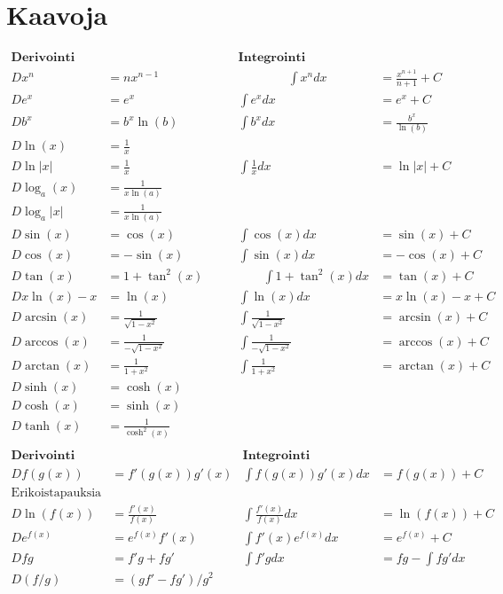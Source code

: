 \documentclass[12pt]{article}
\begin{document}
\section*{Kaavoja}

$$
\begin{array}{rl|rl}
\textbf{Derivointi} && \textbf{Integrointi}&\\[2mm]
Dx^n&=nx^{n-1}     \qquad\qquad&\qquad\qquad\int x^ndx&=\frac{x^{n+1}}{n+1}+C \\[2mm]
De^x&=e^x &\int e^xdx&=e^x+C\\[2mm]
Db^x&=b^x\ln(b) & \int b^xdx&=\frac{b^x}{\ln(b)}\\[2mm]
D\ln(x)&=\frac{1}{x} &&\\[2mm]
D\ln|x|&=\frac{1}{x} &\int\frac{1}{x}dx&=\ln|x|+C\\[2mm]
D\log_a(x)&=\frac{1}{x\ln(a)} &&\\[2mm]
D\log_a|x|&=\frac{1}{x\ln(a)} &&\\[2mm]
D\sin(x)&=\cos(x)   &\int\cos(x)dx&=\sin(x)+C\\[2mm]
D\cos(x)&=-\sin(x)  &\int\sin(x)dx&=-\cos(x)+C\\[2mm]
D\tan(x)&=1+\tan^2(x) \qquad&\qquad\int 1+\tan^2(x)dx&=\tan(x)+C\\[2mm]

Dx\ln(x)-x&=\ln(x) & \int\ln(x)dx&=x\ln(x)-x+C\\[10mm]

D\arcsin(x)&=\frac{1}{\sqrt{1-x^2}} & \int\frac{1}{\sqrt{1-x^2}}&=\arcsin(x)+C\\
D\arccos(x)&=\frac{1}{-\sqrt{1-x^2}} & \int\frac{1}{-\sqrt{1-x^2}}&=\arccos(x)+C\\
D\arctan(x)&=\frac{1}{1+x^2} & \int\frac{1}{1+x^2}&=\arctan(x)+C\\

D\sinh(x)&=\cosh(x) &&\\
D\cosh(x)&=\sinh(x) &&\\
D\tanh(x)&=\frac{1}{\cosh^2(x)} &&\\
\end{array}  
$$
\vspace{1cm}
$$
\begin{array}{rl|rl}
\textbf{Derivointi} && \textbf{Integrointi}&\\[2mm]
D f(g(x))&=f'(g(x))g'(x) & \int f(g(x))g'(x)dx&=f(g(x))+C\\[2mm]
\textrm{Erikoistapauksia} &&&\\
D\ln(f(x))&=\frac{f'(x)}{f(x)} & \int \frac{f'(x)}{f(x)}dx&=\ln(f(x))+C\\[2mm]
D e^{f(x)}&=e^{f(x)}f'(x) & \int f'(x)e^{f(x)}dx&=e^{f(x)}+C\\[10mm]
D fg&=f'g+fg'& \int f'g dx&=fg-\int fg'dx\\[2mm]
D (f/g)&=(gf'-fg')/g^2 &&\\[2mm]
\end{array}  
$$
\end{document}
